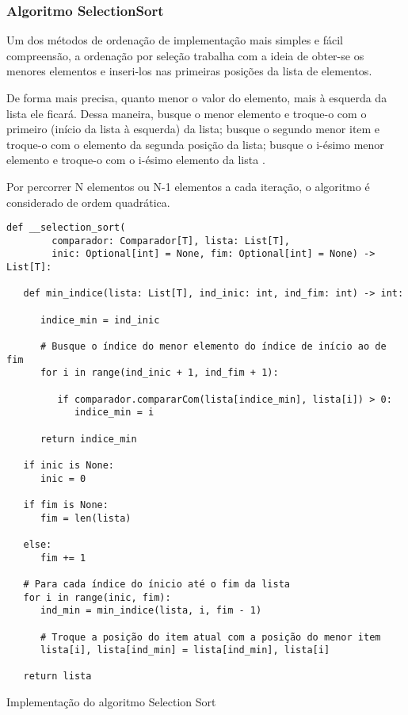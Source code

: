 \documentclass[a4paper,12pt]{scrartcl}
\begin{document}
\subsubsection{Algoritmo SelectionSort}
Um dos métodos de ordenação de implementação mais simples e fácil compreensão, a ordenação por seleção trabalha com a ideia de obter-se os menores elementos e inseri-los nas primeiras posições da lista de elementos.

De forma mais precisa, quanto menor o valor do elemento, mais à esquerda da lista ele ficará. Dessa maneira, busque o menor elemento e troque-o com o primeiro (início da lista à esquerda) da lista; busque o segundo menor item e troque-o com o elemento da segunda posição da lista; busque o i-ésimo menor elemento e troque-o com o i-ésimo elemento da lista \cite{knuth}.

Por percorrer N elementos ou N-1 elementos a cada iteração, o algoritmo é considerado de ordem quadrática.
\begin{listing}[H]
\begin{verbatim}
def __selection_sort(
        comparador: Comparador[T], lista: List[T],
        inic: Optional[int] = None, fim: Optional[int] = None) -> List[T]:

   def min_indice(lista: List[T], ind_inic: int, ind_fim: int) -> int:

      indice_min = ind_inic

      # Busque o índice do menor elemento do índice de início ao de fim
      for i in range(ind_inic + 1, ind_fim + 1):

         if comparador.compararCom(lista[indice_min], lista[i]) > 0:
            indice_min = i

      return indice_min

   if inic is None:
      inic = 0

   if fim is None:
      fim = len(lista)

   else:
      fim += 1

   # Para cada índice do ínicio até o fim da lista
   for i in range(inic, fim):
      ind_min = min_indice(lista, i, fim - 1)

      # Troque a posição do item atual com a posição do menor item
      lista[i], lista[ind_min] = lista[ind_min], lista[i]

   return lista
\end{verbatim}
\caption{\footnotesize{Implementação do algoritmo Selection Sort}}
\end{listing}
\end{document}
